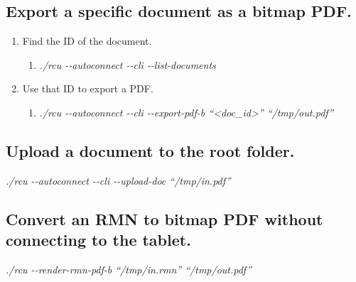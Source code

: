\subsection{Export a specific document as a bitmap PDF.}
\begin{enumerate}
\item{Find the ID of the document.}
  \begin{enumerate}
  \item[]{\textit{./rcu \--\--autoconnect \--\--cli \--\--list-documents}}
  \end{enumerate}
\item{Use that ID to export a PDF.}
  \begin{enumerate}
  \item[]{\textit{./rcu \--\--autoconnect \--\--cli \--\--export-pdf-b ``<doc\_id>'' ``/tmp/out.pdf''}}
  \end{enumerate}
\end{enumerate}


\subsection{Upload a document to the root folder.}
\textit{./rcu \--\--autoconnect \--\--cli \--\--upload-doc ``/tmp/in.pdf''}


\subsection{Convert an RMN to bitmap PDF without connecting to the tablet.}
\textit{./rcu \--\--render-rmn-pdf-b ``/tmp/in.rmn'' ``/tmp/out.pdf''}
\newpage
